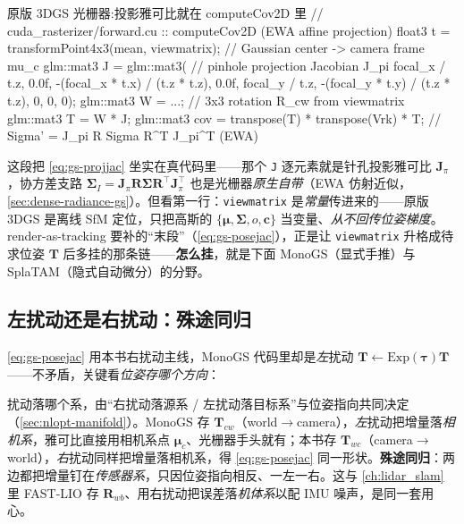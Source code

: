 \begin{codebox}[C++]{原版 3DGS 光栅器:投影雅可比就在 computeCov2D 里}
// cuda_rasterizer/forward.cu :: computeCov2D  (EWA affine projection)
float3 t = transformPoint4x3(mean, viewmatrix);    // Gaussian center -> camera frame  mu_c
glm::mat3 J = glm::mat3(                            // pinhole projection Jacobian  J_pi
    focal_x / t.z, 0.0f, -(focal_x * t.x) / (t.z * t.z),
    0.0f, focal_y / t.z, -(focal_y * t.y) / (t.z * t.z),
    0, 0, 0);
glm::mat3 W = ...;                                  // 3x3 rotation R_cw from viewmatrix
glm::mat3 T = W * J;
glm::mat3 cov = transpose(T) * transpose(Vrk) * T; // Sigma' = J_pi R Sigma R^T J_pi^T  (EWA)
\end{codebox}

\noindent{}这段把 \cref{eq:gs-projjac} 坐实在真代码里——那个 \texttt{J} 逐元素就是针孔投影雅可比 $\mathbf J_\pi$，协方差支路 $\boldsymbol\Sigma_I=\mathbf J_\pi\mathbf R\boldsymbol\Sigma\mathbf R^\top\mathbf J_\pi^\top$ 也是光栅器\emph{原生自带}（EWA 仿射近似，\cref{sec:dense-radiance-gs}）。但看第一行：\texttt{viewmatrix} 是\emph{常量}传进来的——原版 3DGS 是离线 SfM 定位，只把高斯的 $\{\boldsymbol\mu,\boldsymbol\Sigma,o,\mathbf c\}$ 当变量、\emph{从不回传位姿梯度}。render-as-tracking 要补的“末段”（\cref{eq:gs-posejac}），正是让 \texttt{viewmatrix} 升格成待求位姿 $\mathbf T$ 后多挂的那条链——\textbf{怎么挂}，就是下面 MonoGS（显式手推）与 SplaTAM（隐式自动微分）的分野。

\subsection{左扰动还是右扰动：殊途同归}

\cref{eq:gs-posejac} 用本书右扰动主线，MonoGS 代码里却是\emph{左}扰动 $\mathbf T\leftarrow\mathrm{Exp}(\boldsymbol\tau)\mathbf T$——不矛盾，关键看\emph{位姿存哪个方向}：

\begin{note}
扰动落哪个系，由“右扰动落源系 / 左扰动落目标系”与位姿指向共同决定（\cref{sec:nlopt-manifold}）。MonoGS 存 $\mathbf T_{cw}$（world$\to$camera），\emph{左}扰动把增量落\emph{相机系}，雅可比直接用相机系点 $\boldsymbol\mu_c$、光栅器手头就有；本书存 $\mathbf T_{wc}$（camera$\to$world），\emph{右}扰动同样把增量落相机系，得 \cref{eq:gs-posejac} 同一形状。\textbf{殊途同归}：两边都把增量钉在\emph{传感器系}，只因位姿指向相反、一左一右。这与 \cref{ch:lidar_slam} 里 FAST-LIO 存 $\mathbf R_{wb}$、用右扰动把误差落\emph{机体系}以配 IMU 噪声，是同一套用心。
\end{note}

